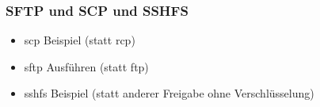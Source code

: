 \begin{frame}
\frametitle{SFTP und SCP und SSHFS}
\begin{itemize}
\item scp Beispiel (statt rcp)
\item sftp Ausführen (statt ftp)
\item sshfs Beispiel (statt anderer Freigabe ohne Verschlüsselung)
\end{itemize}
\end{frame}